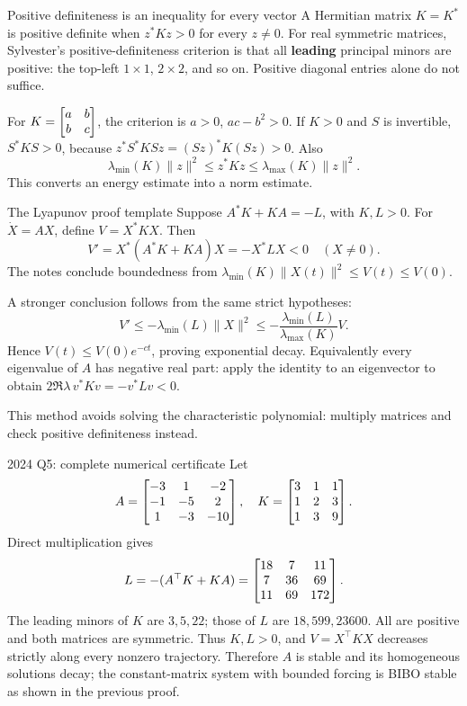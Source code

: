 \begin{concept}{Positive definiteness is an inequality for every vector}
A Hermitian matrix $K=K^*$ is positive definite when $z^*Kz>0$ for every $z\ne0$. For real symmetric matrices, Sylvester's positive-definiteness criterion is that all \textbf{leading} principal minors are positive: the top-left $1\times1$, $2\times2$, and so on. Positive diagonal entries alone do not suffice.

For $K=\begin{bmatrix}a&b\\b&c\end{bmatrix}$, the criterion is $a>0$, $ac-b^2>0$. If $K>0$ and $S$ is invertible, $S^*KS>0$, because $z^*S^*KSz=(Sz)^*K(Sz)>0$. Also
\[\lambda_{\min}(K)\|z\|^2\leq z^*Kz\leq\lambda_{\max}(K)\|z\|^2.\]
This converts an energy estimate into a norm estimate.
\end{concept}
\begin{method}{The Lyapunov proof template}
Suppose $A^*K+KA=-L$, with $K,L>0$. For $\dot X=AX$, define $V=X^*KX$. Then
\[V'=X^*(A^*K+KA)X=-X^*LX<0\quad(X\ne0).\]
The notes conclude boundedness from $\lambda_{\min}(K)\|X(t)\|^2\leq V(t)\leq V(0)$.

A stronger conclusion follows from the same strict hypotheses:
\[V'\leq-\lambda_{\min}(L)\|X\|^2\leq-\frac{\lambda_{\min}(L)}{\lambda_{\max}(K)}V.\]
Hence $V(t)\leq V(0)e^{-ct}$, proving exponential decay. Equivalently every eigenvalue of $A$ has negative real part: apply the identity to an eigenvector to obtain $2\Re\lambda\,v^*Kv=-v^*Lv<0$.

This method avoids solving the characteristic polynomial: multiply matrices and check positive definiteness instead.
\end{method}
\begin{worked}{2024 Q5: complete numerical certificate}
Let
\[A=\begin{bmatrix}-3&1&-2\\-1&-5&2\\1&-3&-10\end{bmatrix},\quad K=\begin{bmatrix}3&1&1\\1&2&3\\1&3&9\end{bmatrix}.\]
Direct multiplication gives
\[L=-(A^{\top}K+KA)=\begin{bmatrix}18&7&11\\7&36&69\\11&69&172\end{bmatrix}.\]
The leading minors of $K$ are $3,5,22$; those of $L$ are $18,599,23600$. All are positive and both matrices are symmetric. Thus $K,L>0$, and $V=X^{\top}KX$ decreases strictly along every nonzero trajectory. Therefore $A$ is stable and its homogeneous solutions decay; the constant-matrix system with bounded forcing is BIBO stable as shown in the previous proof.
\end{worked}
